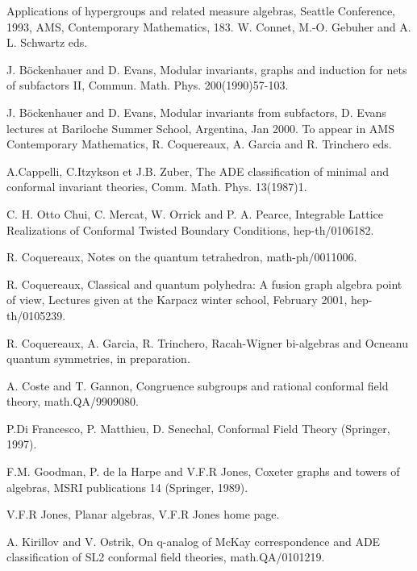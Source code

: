 \documentclass[a4paper,11pt]{article}
\begin{document}
\begin{thebibliography}{99}

 Applications of hypergroups and related
measure algebras, Seattle Conference, 1993, AMS, Contemporary
Mathematics, 183. W. Connet, M.-O. Gebuher and A. L. Schwartz eds.

 J. B\"ockenhauer and D. Evans, Modular invariants, graphs and \myHighlight{$\alpha$}\coordHE{} induction for nets of subfactors II,
Commun. Math. Phys. 200(1990)57-103.

 J. B\"ockenhauer and D. Evans, Modular invariants from subfactors, D. Evans lectures at Bariloche Summer School,
Argentina, Jan 2000. To appear in AMS Contemporary Mathematics, R. Coquereaux, A. Garcia and R. Trinchero eds.

 A.Cappelli, C.Itzykson et J.B. Zuber, The
ADE classification of minimal and \coordHE{} conformal invariant
theories, Comm. Math. Phys. 13(1987)1.

 C. H. Otto Chui, C. Mercat, W. Orrick and P. A. Pearce, Integrable Lattice 
Realizations of Conformal Twisted Boundary Conditions, hep-th/0106182.

 R. Coquereaux, Notes on the quantum
tetrahedron, math-ph/0011006.

 R. Coquereaux, Classical and quantum
polyhedra: A fusion graph algebra point of view, Lectures given at
the Karpacz winter school, February 2001, hep-th/0105239. 

 R. Coquereaux, A. Garcia, R. Trinchero,
Racah-Wigner bi-algebras and Ocneanu quantum symmetries, in preparation.

 A. Coste and T. Gannon, Congruence subgroups and rational conformal field theory, math.QA/9909080.

 P.Di Francesco, P. Matthieu, D. Senechal, Conformal Field Theory (Springer, 1997).

 F.M. Goodman, P. de la Harpe and V.F.R Jones, Coxeter graphs and towers of algebras, MSRI publications 14 (Springer, 1989).

 V.F.R Jones, Planar algebras, V.F.R
Jones home page.

 A. Kirillov and V. Ostrik, On q-analog
of McKay correspondence and ADE classification of SL2 conformal field
theories, math.QA/0101219.



\end{thebibliography}
\end{document}
